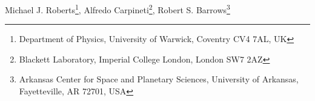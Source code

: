 Michael J. Roberts\footnote{\tiny{Department of Physics, University of Warwick, Coventry CV4 7AL, UK}}, Alfredo Carpineti\footnote{\tiny{Blackett Laboratory, Imperial College London, London SW7 2AZ}}, Robert S. Barrows\footnote{\tiny{Arkansas Center for Space and Planetary Sciences, University of Arkansas, Fayetteville, AR 72701, USA}}